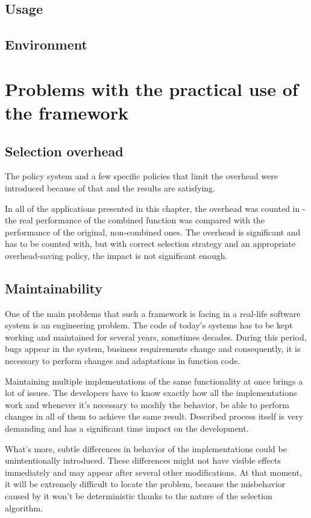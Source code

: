 \subsection{Usage}
\subsection{Environment}

\section{Problems with the practical use of the framework}

\subsection{Selection overhead}

The policy system and a few specific policies that limit the overhead were introduced because of that and the results are satisfying.

In all of the applications presented in this chapter, the overhead was counted in - the real performance of the combined function was compared with the performance of the original, non-combined ones. The overhead is significant and has to be counted with, but with correct selection strategy and an appropriate overhead-saving policy, the impact is not significant enough.

\subsection{Maintainability}

One of the main problems that such a framework is facing in a real-life software system is an engineering problem. The code of today's systems has to be kept working and maintained for several years, sometimes decades. During this period, bugs appear in the system, business requirements change and consequently, it is necessary to perform changes and adaptations in function code.

Maintaining multiple implementations of the same functionality at once brings a lot of issues. The developers have to know exactly how all the implementations work and whenever it's necessary to modify the behavior, be able to perform changes in all of them to achieve the same result. Described process itself is very demanding and has a significant time impact on the development. 

What's more, subtle differences in behavior of the implementations could be unintentionally introduced. These differences might not have visible effects immediately and may appear after several other modifications. At that moment, it will be extremely difficult to locate the problem, because the misbehavior caused by it won't be deterministic thanks to the nature of the selection algorithm.

